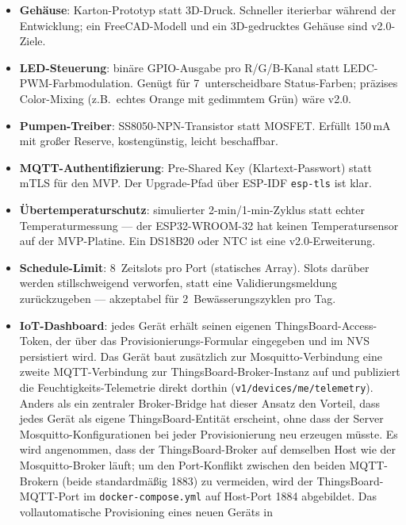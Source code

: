 \documentclass[a4paper,12pt]{article}
\begin{document}
\begin{itemize}
  \item \textbf{Gehäuse}: Karton-Prototyp statt 3D-Druck. Schneller
        iterierbar während der Entwicklung; ein FreeCAD-Modell und
        ein 3D-gedrucktes Gehäuse sind v2.0-Ziele.
  \item \textbf{LED-Steuerung}: binäre GPIO-Ausgabe pro R/G/B-Kanal
        statt LEDC-PWM-Farbmodulation. Genügt für 7~unterscheidbare
        Status-Farben; präzises Color-Mixing (z.B.\ echtes Orange
        mit gedimmtem Grün) wäre v2.0.
  \item \textbf{Pumpen-Treiber}: SS8050-NPN-Transistor statt MOSFET.
        Erfüllt 150\,mA mit großer Reserve, kostengünstig, leicht
        beschaffbar.
  \item \textbf{MQTT-Authentifizierung}: Pre-Shared Key
        (Klartext-Passwort) statt mTLS für den MVP. Der
        Upgrade-Pfad über ESP-IDF \texttt{esp-tls} ist klar.
  \item \textbf{Übertemperaturschutz}: simulierter
        2-min/1-min-Zyklus statt echter Temperaturmessung --- der
        ESP32-WROOM-32 hat keinen Temperatursensor auf der
        MVP-Platine. Ein DS18B20 oder NTC ist eine v2.0-Erweiterung.
  \item \textbf{Schedule-Limit}: 8~Zeitslots pro Port (statisches
        Array). Slots darüber werden stillschweigend verworfen, statt
        eine Validierungsmeldung zurückzugeben --- akzeptabel für
        2~Bewässerungszyklen pro Tag.
  \item \textbf{IoT-Dashboard}: jedes Gerät erhält seinen eigenen
        ThingsBoard-Access-Token, der über das Provisionierungs-Formular
        eingegeben und im NVS persistiert wird. Das Gerät baut zusätzlich
        zur Mosquitto-Verbindung eine zweite MQTT-Verbindung zur
        ThingsBoard-Broker-Instanz auf und publiziert die
        Feuchtigkeits-Telemetrie direkt dorthin (\texttt{v1/devices/me/telemetry}).
        Anders als ein zentraler Broker-Bridge hat dieser Ansatz den
        Vorteil, dass jedes Gerät als eigene ThingsBoard-Entität
        erscheint, ohne dass der Server Mosquitto-Konfigurationen
        bei jeder Provisionierung neu erzeugen müsste.
        Es wird angenommen, dass der ThingsBoard-Broker auf demselben
        Host wie der Mosquitto-Broker läuft; um den Port-Konflikt
        zwischen den beiden MQTT-Brokern (beide standardmäßig 1883)
        zu vermeiden, wird der ThingsBoard-MQTT-Port im
        \texttt{docker-compose.yml} auf Host-Port 1884 abgebildet.
        Das vollautomatische Provisioning eines neuen Geräts in

\end{itemize}
\end{document}
